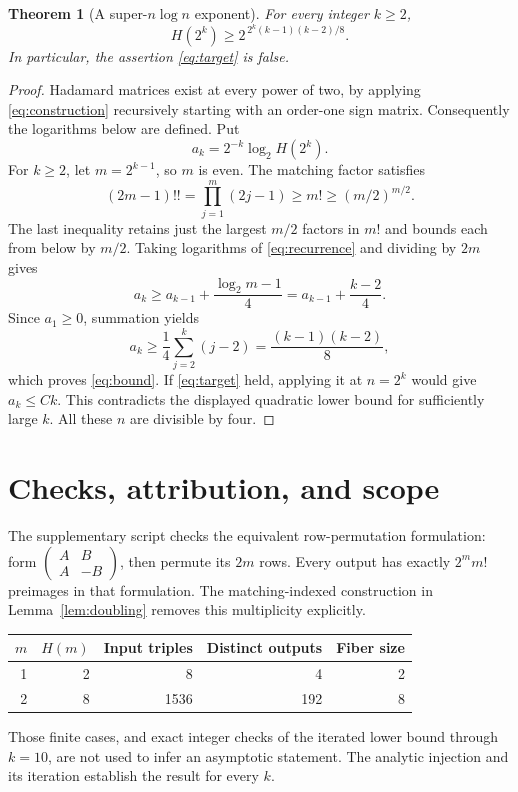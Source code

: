\documentclass[11pt,a4paper]{article}
\newtheorem{theorem}{Theorem}\newtheorem{lemma}{Lemma}\newtheorem{corollary}{Corollary}
\begin{document}
\begin{theorem}[A super-$n\log n$ exponent]\label{thm:main}
For every integer $k\ge2$,
\begin{equation}\label{eq:bound}
 \boxed{H(2^k)\ge 2^{\,2^k(k-1)(k-2)/8}.}
\end{equation}
In particular, the assertion \eqref{eq:target} is false.
\end{theorem}
\begin{proof}
Hadamard matrices exist at every power of two, by applying
\eqref{eq:construction} recursively starting with an order-one sign matrix.
Consequently the logarithms below are defined. Put
\[
 a_k=2^{-k}\log_2 H(2^k).
\]
For $k\ge2$, let $m=2^{k-1}$, so $m$ is even. The matching factor satisfies
\[
 (2m-1)!!=\prod_{j=1}^m(2j-1)\ge m!
 \ge (m/2)^{m/2}.
\]
The last inequality retains just the largest $m/2$ factors in $m!$ and
bounds each from below by $m/2$. Taking logarithms of
\eqref{eq:recurrence} and dividing by $2m$ gives
\[
 a_k\ge a_{k-1}+\frac{\log_2m-1}{4}
       =a_{k-1}+\frac{k-2}{4}.
\]
Since $a_1\ge0$, summation yields
\[
 a_k\ge\frac14\sum_{j=2}^k(j-2)
      =\frac{(k-1)(k-2)}8,
\]
which proves \eqref{eq:bound}.
If \eqref{eq:target} held, applying it at $n=2^k$ would give $a_k\le Ck$.
This contradicts the displayed quadratic lower bound for sufficiently large
$k$. All these $n$ are divisible by four.
\end{proof}

\section{Checks, attribution, and scope}
The supplementary script checks the equivalent row-permutation formulation:
form $\left(\begin{smallmatrix}A&B\\A&-B\end{smallmatrix}\right)$, then
permute its $2m$ rows. Every output has exactly $2^m m!$ preimages in that
formulation. The matching-indexed construction in Lemma~\ref{lem:doubling}
removes this multiplicity explicitly.
\begin{center}
\begin{tabular}{rrrrr}\toprule
$m$ & $H(m)$ & Input triples & Distinct outputs & Fiber size\\\midrule
1 & 2 & 8 & 4 & 2\\
2 & 8 & 1536 & 192 & 8\\\bottomrule
\end{tabular}
\end{center}
Those finite cases, and exact integer checks of the iterated lower bound
through $k=10$, are not used to infer an asymptotic statement. The analytic
injection and its iteration establish the result for every $k$.
\end{document}
